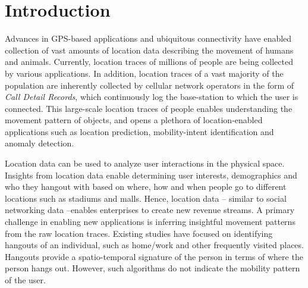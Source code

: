 \section{Introduction}
Advances in GPS-based applications and ubiquitous connectivity have enabled collection of vast amounts of location data describing the movement of humans and animals. Currently, location traces of millions of people are being collected by various applications. In addition, location traces of a vast majority of the population are inherently collected by cellular network operators in the form of \emph{Call Detail Records}, which continuously log the base-station to which the user is connected. This large-scale location traces of people enables understanding the movement pattern of objects, and opens a plethora of location-enabled applications such as location prediction, mobility-intent identification and anomaly detection. 

Location data can be used to analyze user interactions in the physical space. Insights from location data enable determining user interests, demographics and who they hangout with based on where, how and when people go to different locations such as stadiums and malls. Hence, location data -- similar to social networking data --enables enterprises to create new revenue streams. A primary challenge in enabling new applications is inferring insightful movement patterns from the raw location traces. Existing studies have focused on identifying hangouts of an individual, such as home/work and other frequently visited places. Hangouts provide a spatio-temporal signature of the person in terms of where the person hangs out. However, such algorithms do not indicate the mobility pattern of the user. 

